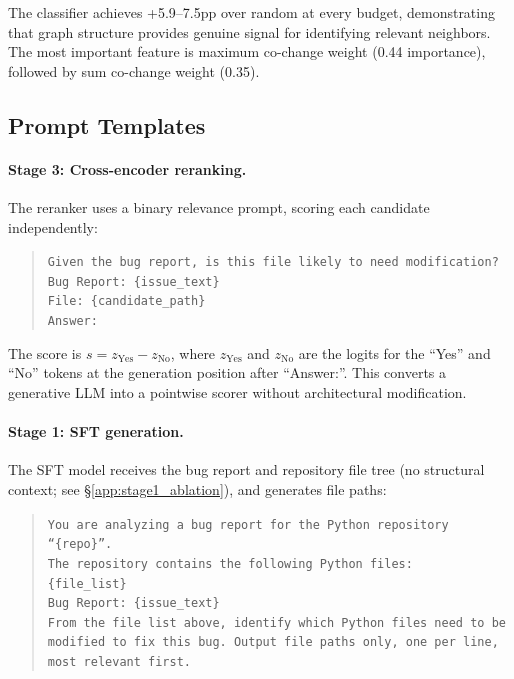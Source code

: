 \documentclass{article}
\begin{document}
The classifier achieves +5.9--7.5pp over random at every budget, demonstrating that graph structure provides genuine signal for identifying relevant neighbors.
The most important feature is maximum co-change weight (0.44 importance), followed by sum co-change weight (0.35).


\subsection{Prompt Templates}
\label{app:prompts}

\paragraph{Stage 3: Cross-encoder reranking.}
The reranker uses a binary relevance prompt, scoring each candidate independently:

\begin{quote}
\small
\texttt{Given the bug report, is this file likely to need modification?}\\[2pt]
\texttt{Bug Report: \{issue\_text\}}\\[2pt]
\texttt{File: \{candidate\_path\}}\\[2pt]
\texttt{Answer:}
\end{quote}

The score is $s = z_{\text{Yes}} - z_{\text{No}}$, where $z_{\text{Yes}}$ and $z_{\text{No}}$ are the logits for the ``Yes'' and ``No'' tokens at the generation position after ``Answer:''.
This converts a generative LLM into a pointwise scorer without architectural modification.

\paragraph{Stage 1: SFT generation.}
The SFT model receives the bug report and repository file tree (no structural context; see \S\ref{app:stage1_ablation}), and generates file paths:

\begin{quote}
\small
\texttt{You are analyzing a bug report for the Python repository ``\{repo\}''.}\\[2pt]
\texttt{The repository contains the following Python files:}\\
\texttt{\{file\_list\}}\\[2pt]
\texttt{Bug Report: \{issue\_text\}}\\[2pt]
\texttt{From the file list above, identify which Python files need to be modified to fix this bug. Output file paths only, one per line, most relevant first.}
\end{quote}
\end{document}
